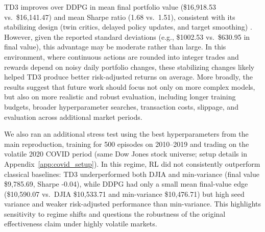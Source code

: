 \documentclass{article}
\begin{document}
TD3 improves over DDPG in mean final portfolio value (\$16{,}918.53 vs.\ \$16{,}141.47) and mean Sharpe ratio (1.68 vs.\ 1.51), consistent with its stabilizing design (twin critics, delayed policy updates, and target smoothing) \cite{fujimoto2018}. However, given the reported standard deviations (e.g., \$1002.53 vs.\ \$630.95 in final value), this advantage may be moderate rather than large. In this environment, where continuous actions are rounded into integer trades and rewards depend on noisy daily portfolio changes, these stabilizing changes likely helped TD3 produce better risk-adjusted returns on average. More broadly, the results suggest that future work should focus not only on more complex models, but also on more realistic and robust evaluation, including longer training budgets, broader hyperparameter searches, transaction costs, slippage, and evaluation across additional market periods.

We also ran an additional stress test using the best hyperparameters from the main reproduction, training for 500 episodes on 2010--2019 and trading on the volatile 2020 COVID period (same Dow Jones stock universe; setup details in Appendix~\ref{app:covid_setup}). In this regime, RL did not consistently outperform classical baselines: TD3 underperformed both DJIA and min-variance (final value \$9{,}785.69, Sharpe -0.04), while DDPG had only a small mean final-value edge (\$10{,}590.07 vs.\ DJIA \$10{,}533.71 and min-variance \$10{,}476.71) but high seed variance and weaker risk-adjusted performance than min-variance. This highlights sensitivity to regime shifts and questions the robustness of the original effectiveness claim under highly volatile markets.

\begin{table}[H]
\centering
\caption{COVID-19 stress-test performance on the 2020 trading period. RL results are mean across seeds, with standard deviation in parentheses.}
\label{tab:covid_results}
\end{table}
\end{document}
